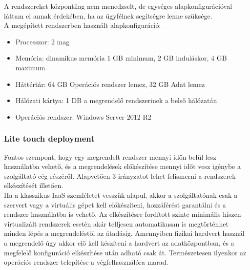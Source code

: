 \documentclass[12pt,oneside,justify,table]{book}
\begin{document}
A rendszereket központilag nem menedzselt, de egységes alapkonfigurációval láttam el annak érdekében, ha az ügyfélnek segítségre lenne szüksége. \\

\noindent A megépített rendszerben használt alapkonfiguráció:
\begin{itemize}
	\item Processzor: 2 mag
	\item Memória: dinamikus memória 1 GB minimum, 2 GB induláskor, 4 GB maximum.
	\item Háttértár: 64 GB Operációs rendszer lemez, 32 GB Adat lemez
	\item Hálózati kártya: 1 DB a megrendelő rendszerinek a belső hálózatán
	\item Operációs rendszer: Windows Server 2012 R2
\end{itemize}

\subsubsection{Lite touch deployment}
Fontos szempont, hogy egy megrendelt rendszer mennyi időn belül lesz használatba vehető, és a megrendelések előkészítése mennyi időt vesz igénybe a szolgáltató cég részéről. Alapvetően 3 irányzatot lehet felismerni a rendszerek elkészítését illetően.\\

Ha a klasszikus IaaS szemléletet vesszük alapul, akkor a szolgáltatónak csak a szervert vagy a virtuális gépet kell előkészíteni, hozzáférést garantálni és a rendszer használatba is vehető. Az elkészítésre fordított szinte minimális hiszen virtualizált rendszerek esetén akár telljesen automatikusan is megtörténhet minden lépés a megrendeléstől az átadásig. Amennyiben fizikai hardvert használ a megrendelő úgy akkor elő kell készíteni a hardvert az adatközpontban, és a megfelelő konfiguráció elkészítése után adható csak át. Természetesen ilyenkor az operációs rendszer telepítése a végfelhasználóra marad. \\
\end{document}
